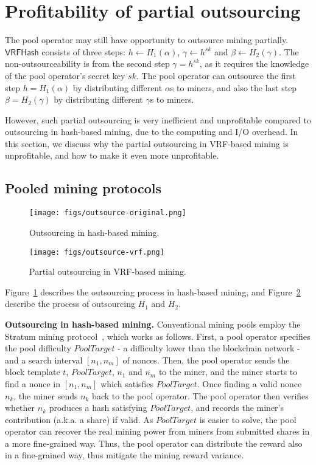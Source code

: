 \section{Profitability of partial outsourcing}
\label{sec:partial-outsourcing}

The pool operator may still have opportunity to outsource mining partially.
$\mathsf{VRFHash}$ consists of three steps: $h \gets H_1(\alpha)$, $\gamma \gets h^{sk}$ and $\beta \gets H_2(\gamma)$.
The non-outsourceability is from the second step $\gamma = h^{sk}$, as it requires the knowledge of the pool operator's secret key $sk$.
The pool operator can outsource the first step $h = H_1(\alpha)$ by distributing different $\alpha$s to miners, and also the last step $\beta = H_2(\gamma)$ by distributing different $\gamma$s to miners.

However, such partial outsourcing is very inefficient and unprofitable compared to outsourcing in hash-based mining, due to the computing and I/O overhead.
In this section, we discuss why the partial outsourcing in VRF-based mining is unprofitable, and how to make it even more unprofitable.

\subsection{Pooled mining protocols}

\begin{figure}[htp]
    \centering
    \texttt{[image: figs/outsource-original.png]}
    \caption{Outsourcing in hash-based mining.}
    \label{fig:outsource-original}
\end{figure}
\begin{figure}[htp]
    \centering
    \texttt{[image: figs/outsource-vrf.png]}
    \caption{Partial outsourcing in VRF-based mining.}
    \label{fig:outsource-vrf}
\end{figure}

Figure~\ref{fig:outsource-original} describes the outsourcing process in hash-based mining, and Figure~\ref{fig:outsource-vrf} describe the process of outsourcing $H_1$ and $H_2$.

\textbf{Outsourcing in hash-based mining.}
Conventional mining pools employ the Stratum mining protocol~\cite{}, which works as follows.
First, a pool operator specifies the pool difficulty $PoolTarget$ - a difficulty lower than the blockchain network - and a search interval $[n_1, n_m]$ of nonces.
Then, the pool operator sends the block template $t$, $PoolTarget$, $n_1$ and $n_m$ to the miner, and the miner starts to find a nonce in $[n_1, n_m]$ which satisfies $PoolTarget$.
Once finding a valid nonce $n_k$, the miner sends $n_k$ back to the pool operator.
The pool operator then verifies whether $n_k$ produces a hash satisfying $PoolTarget$, and records the miner's contribution (a.k.a. a share) if valid.
As $PoolTarget$ is easier to solve, the pool operator can recover the real mining power from miners from submitted shares in a more fine-grained way.
Thus, the pool operator can distribute the reward also in a fine-grained way, thus mitigate the mining reward variance.


